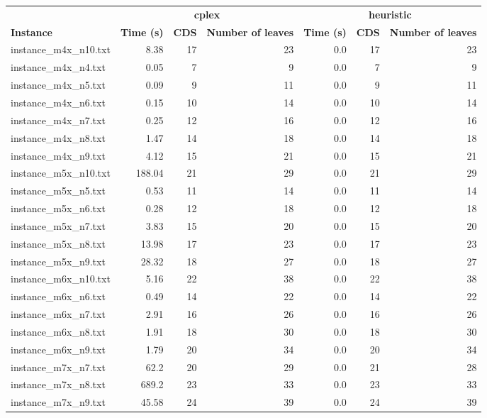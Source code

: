 \documentclass{article}
\begin{document}
\begin{center}
\renewcommand{\arraystretch}{1.4}
 \begin{tabular}{lrrrrrr}
	\hline
 & \multicolumn{3}{c}{\textbf{cplex}} & \multicolumn{3}{c}{\textbf{heuristic}}\\
\textbf{Instance}  & \textbf{Time (s)} & \textbf{CDS} & \textbf{Number of leaves}   & \textbf{Time (s)} & \textbf{CDS} & \textbf{Number of leaves}  \\\hline

instance\_m4x\_n10.txt & 8.38 & 17 & 23
 & 0.0 & 17 & 23
\\
instance\_m4x\_n4.txt & 0.05 & 7 & 9
 & 0.0 & 7 & 9
\\
instance\_m4x\_n5.txt & 0.09 & 9 & 11
 & 0.0 & 9 & 11
\\
instance\_m4x\_n6.txt & 0.15 & 10 & 14
 & 0.0 & 10 & 14
\\
instance\_m4x\_n7.txt & 0.25 & 12 & 16
 & 0.0 & 12 & 16
\\
instance\_m4x\_n8.txt & 1.47 & 14 & 18
 & 0.0 & 14 & 18
\\
instance\_m4x\_n9.txt & 4.12 & 15 & 21
 & 0.0 & 15 & 21
\\
instance\_m5x\_n10.txt & 188.04 & 21 & 29
 & 0.0 & 21 & 29
\\
instance\_m5x\_n5.txt & 0.53 & 11 & 14
 & 0.0 & 11 & 14
\\
instance\_m5x\_n6.txt & 0.28 & 12 & 18
 & 0.0 & 12 & 18
\\
instance\_m5x\_n7.txt & 3.83 & 15 & 20
 & 0.0 & 15 & 20
\\
instance\_m5x\_n8.txt & 13.98 & 17 & 23
 & 0.0 & 17 & 23
\\
instance\_m5x\_n9.txt & 28.32 & 18 & 27
 & 0.0 & 18 & 27
\\
instance\_m6x\_n10.txt & 5.16 & 22 & 38
 & 0.0 & 22 & 38
\\
instance\_m6x\_n6.txt & 0.49 & 14 & 22
 & 0.0 & 14 & 22
\\
instance\_m6x\_n7.txt & 2.91 & 16 & 26
 & 0.0 & 16 & 26
\\
instance\_m6x\_n8.txt & 1.91 & 18 & 30
 & 0.0 & 18 & 30
\\
instance\_m6x\_n9.txt & 1.79 & 20 & 34
 & 0.0 & 20 & 34
\\
instance\_m7x\_n7.txt & 62.2 & 20 & 29
 & 0.0 & 21 & 28
\\
instance\_m7x\_n8.txt & 689.2 & 23 & 33
 & 0.0 & 23 & 33
\\
instance\_m7x\_n9.txt & 45.58 & 24 & 39
 & 0.0 & 24 & 39
\\

\end{tabular}
\end{center}
\end{document}
